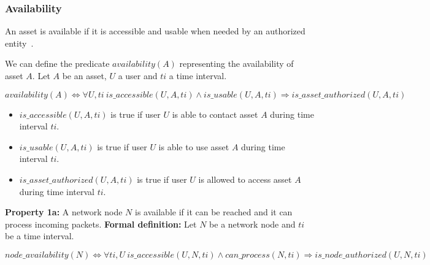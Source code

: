 \subsubsection{Availability}
\label{sec:prop-avail}
An asset is available if it is accessible and usable when
needed by an authorized entity~\cite{ISO/IEC270012013}.

We can define the predicate $availability(A)$ representing the availability of asset $A$.
\newline
Let $A$ be an asset, $U$ a user and $ti$ a time interval.
\newline

\begin{myformula}
$availability(A) \Leftrightarrow \forall U,ti~is\_accessible(U,A,ti) \wedge is\_usable(U,A,ti) \Rightarrow is\_asset\_authorized(U,A,ti)$
\end{myformula}

\begin{itemize}
\item $is\_accessible(U,A,ti)$ is true if user $U$ is able to contact asset $A$ during time interval $ti$.
\item $is\_usable(U,A,ti)$ is true if user $U$ is able to use asset $A$ during time interval $ti$.
\item $is\_asset\_authorized(U,A,ti)$ is true if user $U$ is allowed to access asset $A$  during time interval $ti$.
\end{itemize}

\textbf{Property 1a:} A network node $N$ is available if it can be reached and it can process incoming packets.
\newline
\textbf{Formal definition:} Let $N$ be a network node and $ti$ be a time interval.

\begin{myformula}
$node\_availability(N) \Leftrightarrow \forall ti,U~ is\_accessible(U,N,ti) \wedge can\_process(N,ti) \Rightarrow is\_node\_authorized(U,N,ti)$
\end{myformula}

